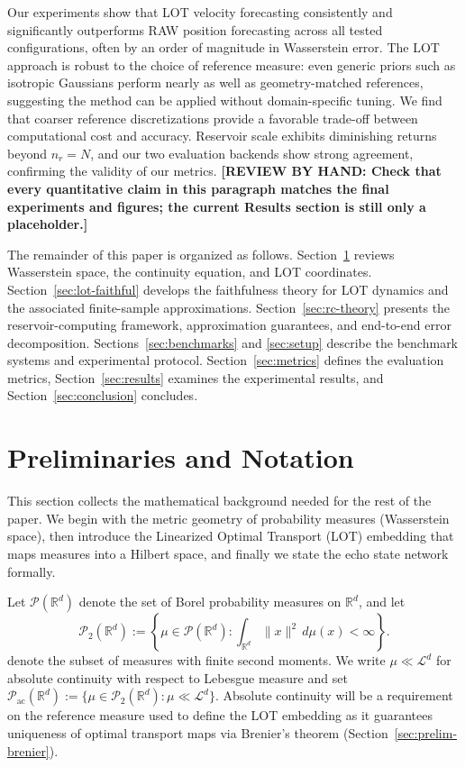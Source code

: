 \documentclass[11pt]{article}
\newcommand{\review}[1]{{\color{red}\textbf{[REVIEW BY HAND: #1]}}}
\newcommand{\R}{\mathbb{R}}
\newcommand{\1}{\mathbf{1}}
\begin{document}
Our experiments show that LOT velocity forecasting consistently and significantly outperforms RAW position forecasting across all tested configurations, often by an order of magnitude in Wasserstein error. The LOT approach is robust to the choice of reference measure: even generic priors such as isotropic Gaussians perform nearly as well as geometry-matched references, suggesting the method can be applied without domain-specific tuning. We find that coarser reference discretizations provide a favorable trade-off between computational cost and accuracy. Reservoir scale exhibits diminishing returns beyond $n_r = N$, and our two evaluation backends show strong agreement, confirming the validity of our metrics.
\review{Check that every quantitative claim in this paragraph matches the final experiments and figures; the current Results section is still only a placeholder.}

The remainder of this paper is organized as follows. Section~\ref{sec:prelim} reviews Wasserstein space, the continuity equation, and LOT coordinates. Section~\ref{sec:lot-faithful} develops the faithfulness theory for LOT dynamics and the associated finite-sample approximations. Section~\ref{sec:rc-theory} presents the reservoir-computing framework, approximation guarantees, and end-to-end error decomposition. Sections~\ref{sec:benchmarks} and \ref{sec:setup} describe the benchmark systems and experimental protocol. Section~\ref{sec:metrics} defines the evaluation metrics, Section~\ref{sec:results} examines the experimental results, and Section~\ref{sec:conclusion} concludes.

\section{Preliminaries and Notation}\label{sec:prelim}
This section collects the mathematical background needed for the rest of the paper. We begin with the metric geometry of probability measures (Wasserstein space), then introduce the Linearized Optimal Transport (LOT) embedding that maps measures into a Hilbert space, and finally we state the echo state network formally. 

Let $\mathcal{P}(\R^d)$ denote the set of Borel probability measures on $\R^d$, and let
\[
\mathcal{P}_2(\R^d):=\left\{\mu\in\mathcal{P}(\R^d): \int_{\R^d}\|x\|^2\,d\mu(x)<\infty\right\}.
\]
denote the subset of measures with finite second moments. We write $\mu\ll\mathcal{L}^d$ for absolute continuity with respect to Lebesgue measure and set $\mathcal{P}_{\mathrm{ac}}(\R^d):=\{\mu\in\mathcal{P}_2(\R^d):\mu\ll\mathcal{L}^d\}$. Absolute continuity will be a requirement on the reference measure used to define the LOT embedding as it guarantees uniqueness of optimal transport maps via Brenier's theorem (Section~\ref{sec:prelim-brenier}).
\end{document}
